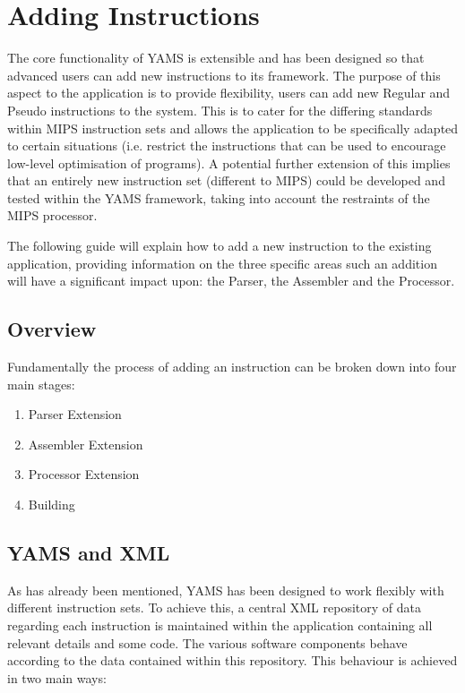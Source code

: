 \section{Adding Instructions}


The core functionality of YAMS is extensible and has been designed so that advanced users can add new instructions to its framework. The purpose of this aspect to the application is to provide flexibility, users can add new Regular and Pseudo instructions to the system. This is to cater for the differing standards within MIPS instruction sets and allows the application to be specifically adapted to certain situations (i.e. restrict the instructions that can be used to encourage low-level optimisation of programs). A potential further extension of this implies that an entirely new instruction set (different to MIPS) could be developed and tested within the YAMS framework, taking into account the restraints of the MIPS processor.

The following guide will explain how to add a new instruction to the existing application, providing information on the three specific areas such an addition will have a significant impact upon: the Parser, the Assembler and the Processor.




\subsection{Overview}

Fundamentally the process of adding an instruction can be broken down into four main stages:

\begin{enumerate}
\item Parser Extension
\item Assembler Extension
\item Processor Extension
\item Building
\end{enumerate}




\subsection{YAMS and XML}

As has already been mentioned, YAMS has been designed to work flexibly with different instruction sets. To achieve this, a central XML repository of data regarding each instruction is maintained within the application containing all relevant details and some code. The various software components behave according to the data contained within this repository. This behaviour is achieved in two main ways:



